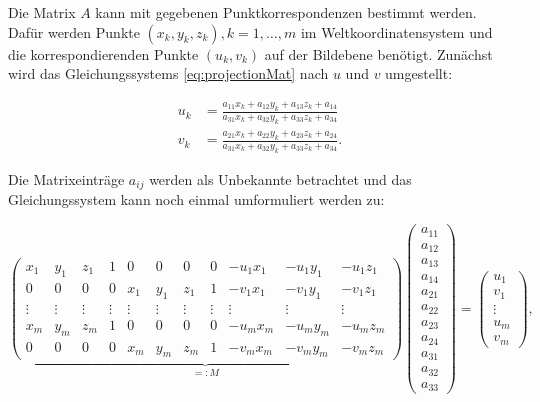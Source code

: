 
Die Matrix $A$ kann mit gegebenen Punktkorrespondenzen bestimmt werden. Dafür werden Punkte $(x_k,y_k, z_k), k = 1,\dotsc,m$ im Weltkoordinatensystem und die korrespondierenden Punkte $(u_k, v_k)$ auf der Bildebene benötigt. 
Zunächst wird das Gleichungssystems \ref{eq:projectionMat} nach $u$ und $v$ umgestellt:

\[
 \begin{aligned}
 u_k &= \frac{a_{11} x_k +a_{12}y_k + a_{13}z_k + a_{14}}{a_{31} x_k +a_{32}y_k + a_{33}z_k + a_{34}} \\
 v_k &= \frac{a_{21} x_k +a_{22}y_k + a_{23}z_k + a_{24}}{a_{31} x_k +a_{32}y_k + a_{33}z_k + a_{34}}.
 \end{aligned}
\]

Die Matrixeinträge $a_{ij}$ werden als Unbekannte betrachtet und das Gleichungssystem kann noch einmal umformuliert werden zu:

 \setcounter{MaxMatrixCols}{20}
\begin{equation}\label{eq:DLT}
\underbrace{\begin{pmatrix}
x_1 & y_1 & z_1 & 1 & 0 & 0 & 0 & 0 & -u_1 x_1 & -u_1 y_1 & -u_1z_1 \\
0 & 0 & 0 & 0 & x_1 & y_1 & z_1 & 1 & -v_1x_1 & -v_1y_1 & -v_1z_1 \\
\vdots & \vdots & \vdots & \vdots & \vdots & \vdots & \vdots & \vdots & \vdots & \vdots & \vdots\\
x_m & y_m & z_m & 1 & 0 & 0 & 0 & 0 & -u_m x_m & -u_m y_m & -u_m z_m \\
0 & 0 & 0 & 0 & x_m & y_m & z_m & 1 & -v_mx_m & -v_my_m & -v_mz_m
\end{pmatrix}}_{=:M}
\begin{pmatrix}
a_{11} \\ a_{12} \\ a_{13} \\ a_{14} \\ a_{21} \\ a_{22} \\ a_{23} \\ a_{24} \\ a_{31} \\ a_{32} \\ a_{33}
\end{pmatrix} =
\begin{pmatrix}
u_1 \\ v_1 \\ \vdots \\ u_m \\ v_m
\end{pmatrix},
\end{equation}

